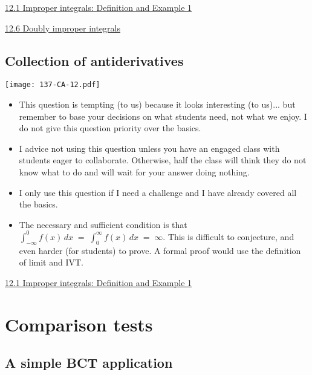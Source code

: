 \documentclass[11pt]{article}
\newcommand {\DS} [1] {${\displaystyle #1}$}
\newcommand{\nl}{\hfill \vspace{-1.1\baselineskip}} %
\newcommand{\vi}{\hspace{8mm} \href{https://www.youtube.com/watch?v=NqxwJ2D-Ckc&list=PLlwePzQY_wW-OVbBuwbFDl8RB5kt2Tngo}{12.1 Improper integrals: Definition and Example 1}}
\newcommand{\vvi}{\hspace{8mm} \href{https://www.youtube.com/watch?v=WAhjLIfNnjI&list=PLlwePzQY_wW-OVbBuwbFDl8RB5kt2Tngo&index=6}{12.6 Doubly improper integrals}}
\begin{document}
\begin{videos}
\vi

\vvi
\end{videos}

\newpage
\subsection{Collection of antiderivatives}

\begin{center}
{ \texttt{[image: 137-CA-12.pdf]}} 
\end{center}

\begin{warning}
\nl
	\begin{itemize}
		\item This question is tempting (to us) because it looks interesting (to us)... but remember to base your decisions on what students need, not what we enjoy.  I do not give this question priority over the basics.
		\item   I advice not using this question unless you have an engaged class with students eager to collaborate.  Otherwise, half the class will think they do not know what to do and will wait for your answer doing nothing.
	\end{itemize}
\end{warning}


\begin{comments}
\nl
	\begin{itemize}
		\item   I only use this question if I need a challenge and I have already covered all the basics.  
		\item The necessary and sufficient condition is that \DS{\int_{-\infty}^0 f(x) \, dx \; = \; \int_0^{\infty} f(x) \, dx \; = \; \infty}.  This is difficult to conjecture, and even harder (for students) to prove.  A formal proof would use the definition of limit and IVT.
	\end{itemize}
\end{comments}

\begin{videos}
\vi
\end{videos}

\newpage
\section{Comparison tests}
\subsection{A simple BCT application}
\end{document}
